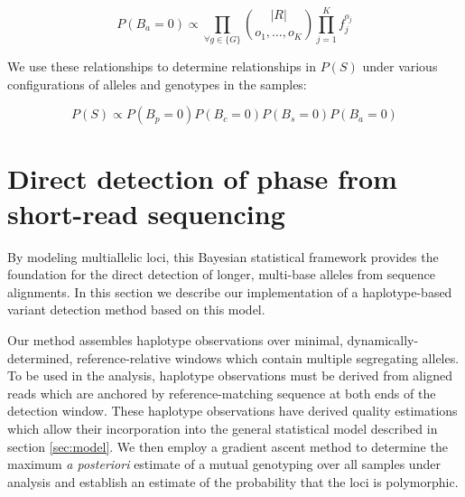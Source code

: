 \documentclass{article}
\begin{document}
\begin{equation}
P(B_a = 0) \propto 
\prod_{\forall g \in \{G\}} 
\binom{ |R| }{ o_1,\ldots,o_K }
\prod_{j=1}^{K} f_j^{o_j}
\end{equation}

We use these relationships to determine relationships in $P(S)$ under various configurations of alleles and genotypes in the samples:

\begin{equation}
P(S) \propto P(B_p = 0) P(B_c = 0) P(B_s = 0) P(B_a = 0)
\end{equation}

\section{Direct detection of phase from short-read sequencing}

By modeling multiallelic loci, this Bayesian statistical framework provides the foundation for the direct detection of longer, multi-base alleles from sequence alignments.  In this section we describe our implementation of a haplotype-based variant detection method based on this model.

Our method assembles haplotype observations over minimal, dynamically-determined, reference-relative windows which contain multiple segregating alleles.  To be used in the analysis, haplotype observations must be derived from aligned reads which are anchored by reference-matching sequence at both ends of the detection window.  These haplotype observations have derived quality estimations which allow their incorporation into the general statistical model described in section \ref{sec:model}.  We then employ a gradient ascent method to determine the maximum \emph{a posteriori} estimate of a mutual genotyping over all samples under analysis and establish an estimate of the probability that the loci is polymorphic.
\end{document}
